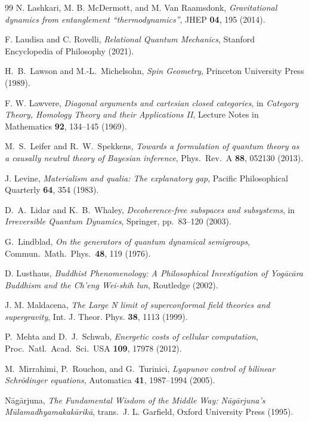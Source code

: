 \documentclass[12pt,a4paper,openany]{book}
\begin{document}
\begin{thebibliography}{99}
N. Lashkari, M. B. McDermott, and M. Van Raamsdonk, \emph{Gravitational dynamics from entanglement ``thermodynamics''}, JHEP \textbf{04}, 195 (2014).

F. Laudisa and C. Rovelli, \emph{Relational Quantum Mechanics}, Stanford Encyclopedia of Philosophy (2021).

H.~B.~Lawson and M.-L.~Michelsohn,
\emph{Spin Geometry},
Princeton University Press (1989).

F. W. Lawvere, \emph{Diagonal arguments and cartesian closed categories}, in \emph{Category Theory, Homology Theory and their Applications II}, Lecture Notes in Mathematics \textbf{92}, 134--145 (1969).

M.~S.~Leifer and R.~W.~Spekkens,
\emph{Towards a formulation of quantum theory as a causally neutral theory of Bayesian inference},
Phys.\ Rev.\ A \textbf{88}, 052130 (2013).

J. Levine, \emph{Materialism and qualia: The explanatory gap}, Pacific Philosophical Quarterly \textbf{64}, 354 (1983).

D.~A.~Lidar and K.~B.~Whaley, \emph{Decoherence-free subspaces and subsystems}, in \emph{Irreversible Quantum Dynamics}, Springer, pp.\ 83--120 (2003).

G.~Lindblad,
\emph{On the generators of quantum dynamical semigroups},
Commun.\ Math.\ Phys.\ \textbf{48}, 119 (1976).

D. Lusthaus, \emph{Buddhist Phenomenology: A Philosophical Investigation of Yogācāra Buddhism and the Ch'eng Wei-shih lun}, Routledge (2002).

J. M. Maldacena, \emph{The Large N limit of superconformal field theories and supergravity}, Int. J. Theor. Phys. \textbf{38}, 1113 (1999).

P.~Mehta and D.~J.~Schwab,
\emph{Energetic costs of cellular computation},
Proc.\ Natl.\ Acad.\ Sci.\ USA \textbf{109}, 17978 (2012).

M.~Mirrahimi, P.~Rouchon, and G.~Turinici, \emph{Lyapunov control of bilinear Schr\"odinger equations}, Automatica \textbf{41}, 1987--1994 (2005).

Nāgārjuna, \emph{The Fundamental Wisdom of the Middle Way: Nāgārjuna's Mūlamadhyamakakārikā}, trans.\ J. L. Garfield, Oxford University Press (1995).


\end{thebibliography}
\end{document}
